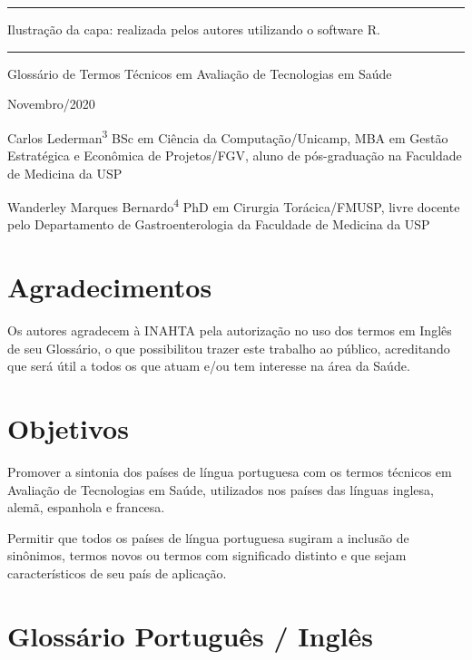 \documentclass[
  openany]{book}
\begin{document}
\begin{center}\rule{0.5\linewidth}{0.5pt}\end{center}

Ilustração da capa: realizada pelos autores utilizando o software R.

\begin{center}\rule{0.5\linewidth}{0.5pt}\end{center}

Glossário de Termos Técnicos em Avaliação de Tecnologias em Saúde

Novembro/2020

Carlos Lederman\textsuperscript{3}
BSc em Ciência da Computação/Unicamp, MBA em Gestão Estratégica e Econômica de Projetos/FGV, aluno de pós-graduação na Faculdade de Medicina da USP

Wanderley Marques Bernardo\textsuperscript{4}
PhD em Cirurgia Torácica/FMUSP, livre docente pelo Departamento de Gastroenterologia da Faculdade de Medicina da USP

\hypertarget{agradecimentos}{%
\chapter*{Agradecimentos}\label{agradecimentos}}

Os autores agradecem à INAHTA pela autorização no uso dos termos em Inglês de seu Glossário, o que possibilitou trazer este trabalho ao público, acreditando que será útil a todos os que atuam e/ou tem interesse na área da Saúde.

\hypertarget{objetivos}{%
\chapter*{Objetivos}\label{objetivos}}

Promover a sintonia dos países de língua portuguesa com os termos técnicos em Avaliação de Tecnologias em Saúde, utilizados nos países das línguas inglesa, alemã, espanhola e francesa.

Permitir que todos os países de língua portuguesa sugiram a inclusão de sinônimos, termos novos ou termos com significado distinto e que sejam característicos de seu país de aplicação.

\hypertarget{glossuxe1rio-portuguuxeas-ingluxeas}{%
\chapter*{Glossário Português / Inglês}\label{glossuxe1rio-portuguuxeas-ingluxeas}}
\end{document}
